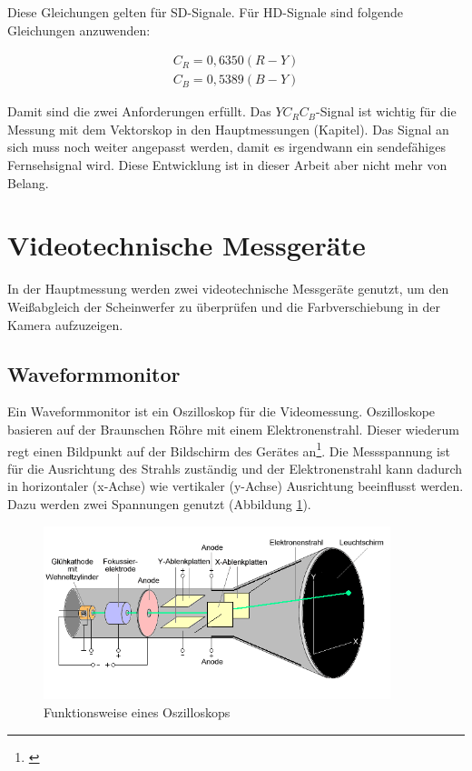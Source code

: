 Diese Gleichungen gelten für SD-Signale. Für HD-Signale sind folgende Gleichungen anzuwenden:

\begin{eqnarray}\label{gl_ycrcb3}
	C_{R}=0,6350(R-Y)\\
	C_{B}=0,5389(B-Y)
\end{eqnarray}


Damit sind die zwei Anforderungen erfüllt. Das $YC_{R}C_{B}$-Signal ist wichtig für die Messung mit dem Vektorskop in den Hauptmessungen (Kapitel). Das Signal an sich muss noch weiter angepasst werden, damit es irgendwann ein sendefähiges Fernsehsignal wird. Diese Entwicklung ist in dieser Arbeit aber nicht mehr von Belang.



\section{Videotechnische Messgeräte}
In der Hauptmessung werden zwei videotechnische Messgeräte genutzt, um den Weißabgleich der Scheinwerfer zu überprüfen und die Farbverschiebung in der Kamera aufzuzeigen.

\subsection{Waveformmonitor}
\label{sec_wmf}
Ein Waveformmonitor ist ein Oszilloskop für die Videomessung. Oszilloskope basieren auf der Braunschen Röhre mit einem Elektronenstrahl. Dieser wiederum regt einen Bildpunkt auf der Bildschirm des Gerätes an\footnote{\cite[109]{schmidt}}.
Die Messspannung ist für die Ausrichtung des Strahls zuständig und der Elektronenstrahl kann dadurch in horizontaler (x-Achse) wie vertikaler (y-Achse) Ausrichtung beeinflusst werden. Dazu werden zwei Spannungen genutzt (Abbildung \ref{b_oszilloskop}).

\begin{figure}[H]     %
\centering
\includegraphics[width=0.9\textwidth]{bilder/oszilloskop} 
\caption {Funktionsweise eines Oszilloskops\protect\footnotemark}\label{b_oszilloskop}
\end{figure}


